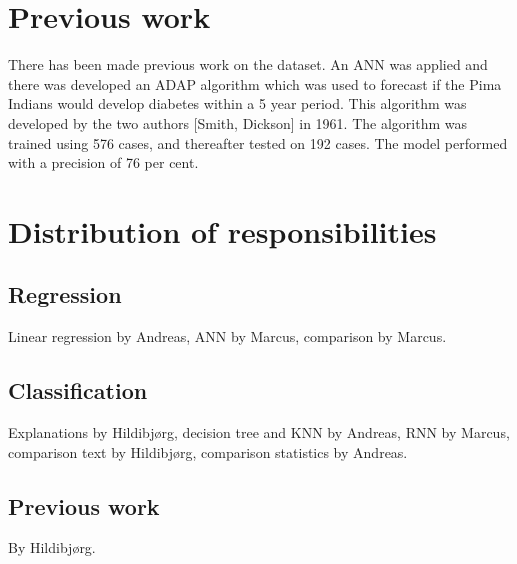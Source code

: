 \section{Previous work}
There has been made previous work on the dataset.
An ANN was applied and there was developed an ADAP algorithm
which was used to forecast if the Pima Indians would develop diabetes within a 5 year period.
This algorithm was developed by the two authors [Smith, Dickson] in 1961.
The algorithm was trained using 576 cases, and thereafter tested on 192 cases. The model performed
with a precision of 76 per cent.




\appendix
\section{Distribution of responsibilities}
\subsection{Regression}
Linear regression by Andreas,
ANN by Marcus,
comparison by Marcus.
\subsection{Classification}
Explanations by Hildibjørg,
decision tree and KNN by Andreas,
RNN by Marcus,
comparison text by Hildibjørg,
comparison statistics by Andreas.
\subsection{Previous work}
By Hildibjørg.
